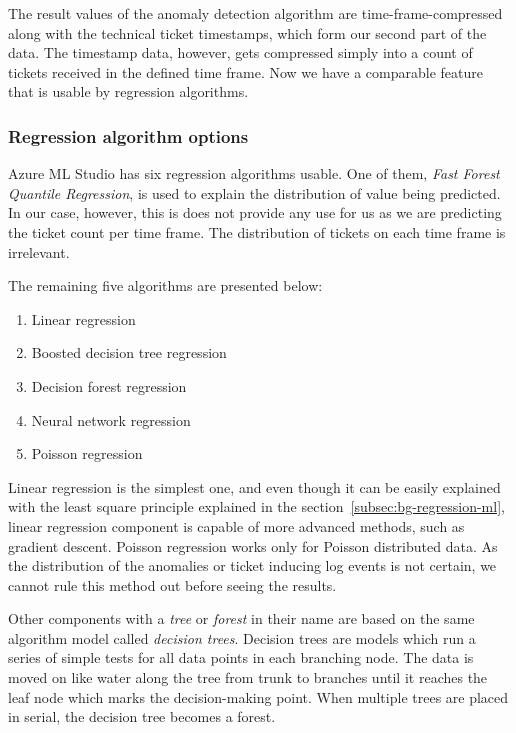 The result values of the anomaly detection algorithm
are time-frame-compressed along with the technical ticket timestamps,
which form our second part of the data.
The timestamp data, however,
gets compressed simply into a count of tickets received in the defined time frame.
Now we have a comparable feature
that is usable by regression algorithms.




\subsubsection*{Regression algorithm options}\label{subsec:pipe-regression-algorithm-options}

Azure ML Studio has six regression algorithms usable.
One of them,
\textit{Fast Forest Quantile Regression},
is used to explain the distribution of value being predicted.\cite{azure2021fastforestquantile}
In our case, however,
this is does not provide any use for us
as we are predicting the ticket count per time frame.
The distribution of tickets on each time frame is irrelevant.

The remaining five algorithms are presented below:
\begin{enumerate}
    \item Linear regression~\cite{azure2021linear}
    \item Boosted decision tree regression~\cite{azure2022boosteddecisiontree}
    \item Decision forest regression~\cite{azure2021decisionforest}
    \item Neural network regression~\cite{azure2021neuralnetwork}
    \item Poisson regression~\cite{azure2021poisson}
\end{enumerate}

Linear regression is the simplest one,
and even though it can be easily explained with the least square principle
explained in the section~\ref{subsec:bg-regression-ml},
linear regression component is capable of more advanced methods,
such as gradient descent.
Poisson regression works only for Poisson distributed data.
As the distribution of the anomalies or ticket inducing log events is not certain,
we cannot rule this method out before seeing the results.

Other components with a \textit{tree} or \textit{forest} in their name
are based on the same algorithm model called \textit{decision trees}.
Decision trees are models
which run a series of simple tests
for all data points in each branching node.
The data is moved on like water along the tree from trunk to branches
until it reaches the leaf node which marks the decision-making point.
When multiple trees are placed in serial,
the decision tree becomes a forest.~\cite{azure2021decisionforest}

